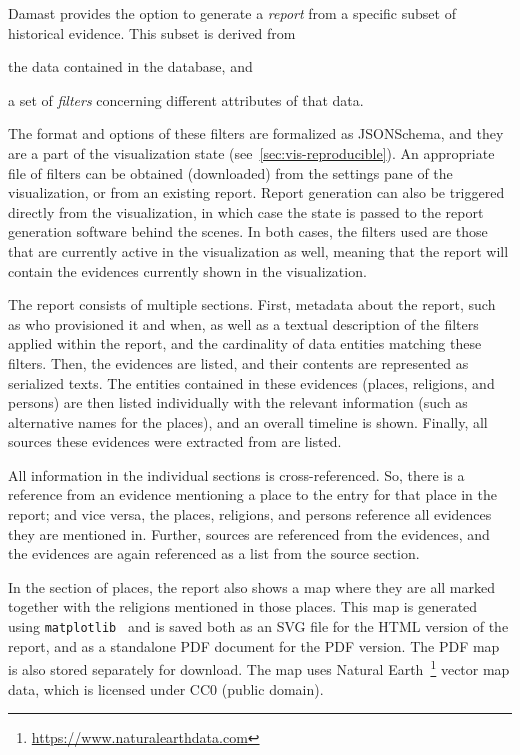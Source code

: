 Damast provides the option to generate a \emph{report} from a specific subset of historical evidence.
This subset is derived from
\begin{enumerate*}[label=(\arabic*)]
  \item the data contained in the database, and
  \item a set of \emph{filters} concerning different attributes of that data.
\end{enumerate*}
The format and options of these filters are formalized as JSONSchema, and they are a part of the visualization state (see~\cref{sec:vis-reproducible}).
An appropriate file of filters can be obtained (downloaded) from the settings pane of the visualization, or from an existing report.
Report generation can also be triggered directly from the visualization, in which case the state is passed to the report generation software behind the scenes.
In both cases, the filters used are those that are currently active in the visualization as well, meaning that the report will contain the evidences currently shown in the visualization.

The report consists of multiple sections.
First, metadata about the report, such as who provisioned it and when, as well as a textual description of the filters applied within the report, and the cardinality of data entities matching these filters.
Then, the evidences are listed, and their contents are represented as serialized texts.
The entities contained in these evidences (places, religions, and persons) are then listed individually with the relevant information (such as alternative names for the places), and an overall timeline is shown.
Finally, all sources these evidences were extracted from are listed.

All information in the individual sections is cross-referenced.
So, there is a reference from an evidence mentioning a place to the entry for that place in the report;
and vice versa, the places, religions, and persons reference all evidences they are mentioned in.
Further, sources are referenced from the evidences, and the evidences are again referenced as a list from the source section.

In the section of places, the report also shows a map where they are all marked together with the religions mentioned in those places.
This map is generated using \verb!matplotlib!~\cite{Hunter_2007} and is saved both as an SVG file for the HTML version of the report, and as a standalone PDF document for the PDF version.
The PDF map is also stored separately for download.
The map uses Natural Earth~\footnote{\url{https://www.naturalearthdata.com}} vector map data, which is licensed under CC0 (public domain).


